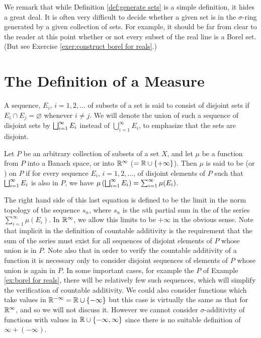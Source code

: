 We remark that while Definition \ref{def:generate sets} is a simple definition, it hides a great deal. It is often very difficult to decide whether a given set is in the $\sigma$-ring generated by a given collection of sets. For example, it should be far from clear to the reader at this point whether or not every subset of the real line is a Borel set. (But see Exercise \ref{exer:construct borel for reals}.)


\section{The Definition of a Measure}


A sequence, $E_i$, $i=1,2,\dots$ of subsets of a set is said to consist of disjoint sets if $E_i\cap E_j=\varnothing$ whenever $i\neq j$. We will denote the union of such a sequence of disjoint sets by $\bigsqcup_{i=1}^\infty E_i$ instead of $\bigcup_{i=1}^\infty E_i$, to emphasize that the sets are disjoint.

\begin{definition}
Let $P$ be an arbitrary collection of subsets of a set $X$, and let $\mu$ be a function from $P$ into a Banach space, or into $\mathbb{R}^\infty$ ($=\mathbb{R}\cup\left\{+\infty\right\}$). Then $\mu$ is said to be  (or ) on $P$ if for every sequence $E_i$, $i=1,2,\dots$, of disjoint elements of $P$ such that $\bigsqcup_{i=1}^\infty E_i$ is also in $P$, we have $\mu\left(\bigsqcup_{i=1}^\infty E_i\right)=\sum_{i=1}^\infty\mu(E_i)$. 
\end{definition}

The right hand side of this last equation is defined to be the limit in the norm topology of the sequence $s_n$, where $s_n$ is the $n$th partial sum in the of the series $\sum_{i=1}^\infty\mu(E_i)$. In $\mathbb{R}^\infty$, we allow this limits to be $+\infty$ in the obvious sense. Note that implicit in the definition of countable additivity is the requirement that the sum of the series must exist for all sequences of disjoint elements of $P$ whose union is in $P$. Note also that in order to verify the countable additivity of a function it is necessary only to consider disjoint sequences of elements of $P$ whose union is again in $P$. In some important cases, for example the $P$ of Example \ref{ex:borel for reals}, there will be relatively few such sequences, which will simplify the verification of countable additivity. We could also consider functions which take values in $\mathbb{R}^{-\infty}=\mathbb{R}\cup\left\{-\infty\right\}$ but this case is virtually the same as that for $\mathbb{R}^\infty$, and so we will not discuss it. However we cannot consider $\sigma$-additivity of functions with values in $\mathbb{R}\cup\left\{-\infty,\infty\right\}$ since there is no suitable definition of $\infty+(-\infty)$.

